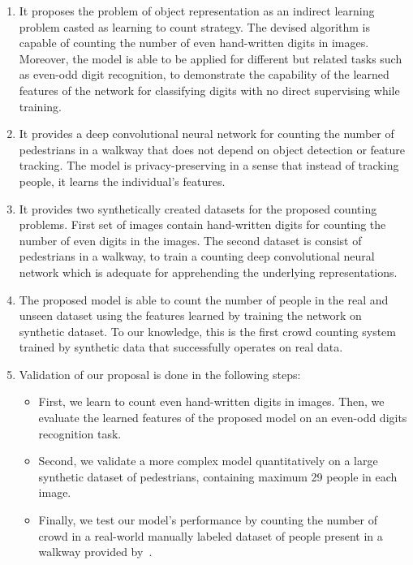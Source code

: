 \begin{enumerate}
	\item It proposes the problem of object representation as an indirect learning problem casted as learning to count strategy. The devised algorithm is capable of counting the number of even hand-written digits in images. Moreover, the model is able to be applied for different but related tasks such as even-odd digit recognition, to demonstrate the capability of the learned features of the network for classifying digits with no direct supervising while training. 
	
	\item It provides a deep convolutional neural network for counting the number of pedestrians in a walkway that does not depend on object detection or feature tracking. The model is privacy-preserving in a sense that instead of tracking people, it learns the individual's features.
	
	\item It provides two synthetically created datasets for the proposed counting problems. First set of images contain hand-written digits for counting the number of even digits in the images. The second dataset is consist of pedestrians in a walkway, to train a counting deep convolutional neural network which is adequate for apprehending the underlying representations.
	 

	\item The proposed model is able to count the number of people in the real and unseen dataset using the features learned by training the network on synthetic dataset. To our knowledge, this is the first crowd counting system trained by synthetic data that successfully operates on real data. 

	\item Validation of our proposal is done in the following steps:

	\begin{itemize}
		\item First, we learn to count even hand-written digits in images. Then, we evaluate the learned features of the proposed model on an even-odd digits recognition task. 
		\item Second, we validate a more complex model  quantitatively on a large synthetic dataset of pedestrians, containing maximum 29 people in each image. 
		\item Finally, we test our model's performance by counting the number of crowd in a real-world manually labeled dataset of people present in a walkway provided by~\citealt*{chan2013ground}. 
	\end{itemize}
	

\end{enumerate}
